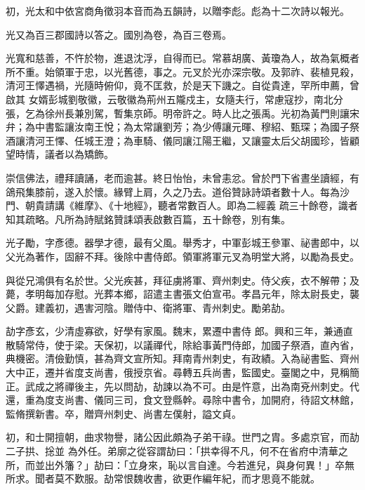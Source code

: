 \begin{pinyinscope}
 初，光太和中依宮商角徵羽本音而為五韻詩，以贈李彪。彪為十二次詩以報光。



 光又為百三郡國詩以答之。國別為卷，為百三卷焉。



 光寬和慈善，不忤於物，進退沈浮，自得而已。常慕胡廣、黃瓊為人，故為氣概者所不重。始領軍于忠，以光舊德，事之。元叉於光亦深宗敬。及郭祚、裴植見殺，清河王懌遇禍，光隨時俯仰，竟不匡救，於是天下譏之。自從貴達，罕所申薦，曾啟其
 女婿彭城劉敬徽，云敬徽為荊州五隴戍主，女隨夫行，常慮寇抄，南北分張，乞為徐州長兼別駕，暫集京師。明帝許之。時人比之張禹。光初為黃門則讓宋弁；為中書監讓汝南王悅；為太常讓劉芳；為少傅讓元暉、穆紹、甄琛；為國子祭酒讓清河王懌、任城王澄；為車騎、儀同讓江陽王繼，又讓靈太后父胡國珍，皆顧望時情，議者以為矯飾。



 崇信佛法，禮拜讀誦，老而逾甚。終日怡怡，未曾恚忿。曾於門下省晝坐讀經，有鴿飛集膝前，遂入於懷。緣臂上肩，久之乃去。道俗贊詠詩頌者數十人。每為沙門、朝貴請講《維摩》、《十地經》，聽者常數百人。即為二經義
 疏三十餘卷，識者知其疏略。凡所為詩賦銘贊誄頌表啟數百篇，五十餘卷，別有集。



 光子勵，字彥德。器學才德，最有父風。舉秀才，中軍彭城王參軍、祕書郎中，以父光為著作，固辭不拜。後除中書侍郎。領軍將軍元叉為明堂大將，以勵為長史。



 與從兄鴻俱有名於世。父光疾甚，拜征虜將軍、齊州刺史。侍父疾，衣不解帶；及薨，孝明每加存慰。光葬本鄉，詔遣主書張文伯宣弔。孝昌元年，除太尉長史，襲父爵。建義初，遇害河陰。贈侍中、衛將軍、青州刺史。勵弟劼。



 劼字彥玄，少清虛寡欲，好學有家風。魏末，累遷中書侍
 郎。興和三年，兼通直散騎常侍，使于梁。天保初，以議禪代，除給事黃門侍郎，加國子祭酒，直內省，典機密。清儉勤慎，甚為齊文宣所知。拜南青州刺史，有政績。入為祕書監、齊州大中正，遷并省度支尚書，俄授京省。尋轉五兵尚書，監國史。臺閣之中，見稱簡正。武成之將禪後主，先以問劼，劼諫以為不可。由是忤意，出為南兗州刺史。代還，重為度支尚書、儀同三司，食文登縣幹。尋除中書令，加開府，待詔文林館，監脩撰新書。卒，贈齊州刺史、尚書左僕射，謚文貞。



 初，和士開擅朝，曲求物譽，諸公因此頗為子弟干祿。世門之胄。多處京官，而劼二子拱、捴並
 為外任。弟廓之從容謂劼曰：「拱幸得不凡，何不在省府中清華之所，而並出外籓？」劼曰：「立身來，恥以言自達。今若進兒，與身何異！」卒無所求。聞者莫不歎服。劼常恨魏收書，欲更作編年紀，而才思竟不能就。




\end{pinyinscope}
